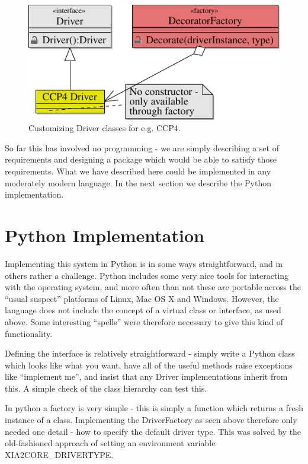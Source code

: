 \documentclass[a4paper, 11pt]{article}
\begin{document}
\begin{figure}
\centerline{
\includegraphics[scale=0.667]{UML/Decorator-1.pdf}
}
\caption{Customizing Driver classes for e.g. CCP4.}
\label{figure:decoratorfactory}
\end{figure}

So far this has involved no programming - we are simply describing a set
of requirements and designing a package which would be able to satisfy those
requirements. What we have described here could be implemented in any 
moderately modern language. In the next section we describe the Python
implementation.

\section{Python Implementation}

Implementing this system in Python is in some ways straightforward, and in 
others rather a challenge. Python includes some very nice tools for interacting
with the operating system, and more often than not these are portable across
the ``usual suspect'' platforms of Linux, Mac OS X and Windows. However,
the language does not include the concept of a virtual class or interface,
as used above. Some interesting ``spells'' were therefore necessary to 
give this kind of functionality. 

Defining the interface is relatively straightforward - simply write a Python
class which looks like what you want, have all of the useful methods raise
exceptions like ``implement me'', and insist that any Driver implementations
inherit from this. A simple check of the class hierarchy can test this.

In python a factory is very simple - this is simply a function which returns
a fresh instance of a class. Implementing the DriverFactory as seen above
therefore only needed one detail - how to specify the default driver type.
This was solved by the old-fashioned approach of setting an environment
variable XIA2CORE\_DRIVERTYPE.
\end{document}
